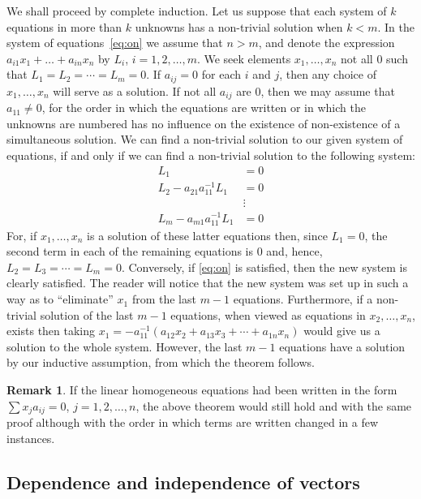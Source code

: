 \documentclass[10pt,leqno]{article}
\theoremstyle{definition}
\newtheorem*{rema}{Remark}
\begin{document}
We shall proceed by complete induction.
Let us suppose that each system of $k$ equations in more than $k$ unknowns has a non-trivial solution when $k < m$.
In the system of equations~\eqref{eq:on} we assume that $n > m$, and denote the expression $a_{i1} x_1 + \ldots + a_{in} x_n$ by $L_i$, $i = 1,2,\ldots,m$.
We seek elements $x_1, \ldots, x_n$ not all $0$ such that $L_1 = L_2 = \cdots = L_m = 0$.
If $a_{ij} = 0$ for each $i$ and $j$, then any choice of $x_1, \ldots, x_n$ will serve as a solution.
If not all $a_{ij}$ are 0, then we may assume that $a_{11} \not= 0$, for the order in which the equations are written or in which the unknowns are numbered has no influence on the existence of non-existence of a simultaneous solution.
We can find a non-trivial solution to our given system of equations, if and only if we can find a non-trivial solution to the following system:
\begin{align*}
L_1 &= 0
\\
L_2 - a_{21} a_{11}^{-1} L_1 &= 0
\\
&\vdots
\\
L_m - a_{m1} a_{11}^{-1} L_1 &= 0
\end{align*}
For, if $x_1, \ldots, x_n$ is a solution of these latter equations then, since $L_1 = 0$, the second term in each of the remaining equations is 0 and, hence, $L_2 = L_3 = \cdots = L_m = 0$.
Conversely, if \eqref{eq:on} is satisfied, then the new system is clearly satisfied.
The reader will notice that the new system was set up in such a way as to ``eliminate'' $x_1$ from the last $m-1$ equations.
Furthermore, if a non-trivial solution of the last $m-1$ equations, when viewed as equations in $x_2, \ldots, x_n$, exists then taking $x_1 = -a_{11}^{-1}(a_{12} x_2 + a_{13} x_3 + \cdots + a_{1n} x_n)$ would give us a solution to the whole system.
However, the last $m-1$ equations have a solution by our inductive assumption, from which the theorem follows.


\begin{rema}
If the linear homogeneous equations had been written in the form $\sum x_j a_{ij} = 0$, $j = 1, 2, \ldots, n$, the above theorem would still hold and with the same proof although with the order in which terms are written changed in a few instances.
\end{rema}



\subsection{Dependence and independence of vectors}
\end{document}
